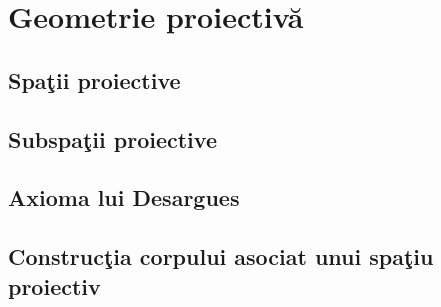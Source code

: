 \documentclass[12pt]{book}
\begin{document}
\chapter{Geometrie proiectiv\u a }

\section{Spa\c tii proiective}

\section{Subspa\c tii proiective}

\section{Axioma lui Desargues}

\section{Construc\c tia corpului asociat unui spa\c tiu proiectiv}
\end{document}
